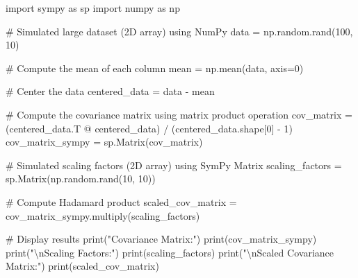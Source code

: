 \documentclass[
  letterpaper,
  DIV=11,
  numbers=noendperiod]{scrreprt}
\newenvironment{Shaded}{\begin{snugshade}}{\end{snugshade}}
\newcommand{\BuiltInTok}[1]{\textcolor[rgb]{0.00,0.23,0.31}{#1}}
\newcommand{\CharTok}[1]{\textcolor[rgb]{0.13,0.47,0.30}{#1}}
\newcommand{\CommentTok}[1]{\textcolor[rgb]{0.37,0.37,0.37}{#1}}
\newcommand{\DecValTok}[1]{\textcolor[rgb]{0.68,0.00,0.00}{#1}}
\newcommand{\ImportTok}[1]{\textcolor[rgb]{0.00,0.46,0.62}{#1}}
\newcommand{\NormalTok}[1]{\textcolor[rgb]{0.00,0.23,0.31}{#1}}
\newcommand{\OperatorTok}[1]{\textcolor[rgb]{0.37,0.37,0.37}{#1}}
\newcommand{\StringTok}[1]{\textcolor[rgb]{0.13,0.47,0.30}{#1}}
\theoremstyle{plain}
\theoremstyle{definition}
\theoremstyle{remark}
\begin{document}
\begin{Shaded}
\begin{Highlighting}[]
\ImportTok{import}\NormalTok{ sympy }\ImportTok{as}\NormalTok{ sp}
\ImportTok{import}\NormalTok{ numpy }\ImportTok{as}\NormalTok{ np}

\CommentTok{\# Simulated large dataset (2D array) using NumPy}
\NormalTok{data }\OperatorTok{=}\NormalTok{ np.random.rand(}\DecValTok{100}\NormalTok{, }\DecValTok{10}\NormalTok{)}

\CommentTok{\# Compute the mean of each column}
\NormalTok{mean }\OperatorTok{=}\NormalTok{ np.mean(data, axis}\OperatorTok{=}\DecValTok{0}\NormalTok{)}

\CommentTok{\# Center the data}
\NormalTok{centered\_data }\OperatorTok{=}\NormalTok{ data }\OperatorTok{{-}}\NormalTok{ mean}

\CommentTok{\# Compute the covariance matrix using matrix product operation}
\NormalTok{cov\_matrix }\OperatorTok{=}\NormalTok{ (centered\_data.T }\OperatorTok{@}\NormalTok{ centered\_data) }\OperatorTok{/}\NormalTok{ (centered\_data.shape[}\DecValTok{0}\NormalTok{] }\OperatorTok{{-}} \DecValTok{1}\NormalTok{)}
\NormalTok{cov\_matrix\_sympy }\OperatorTok{=}\NormalTok{ sp.Matrix(cov\_matrix)}

\CommentTok{\# Simulated scaling factors (2D array) using SymPy Matrix}
\NormalTok{scaling\_factors }\OperatorTok{=}\NormalTok{ sp.Matrix(np.random.rand(}\DecValTok{10}\NormalTok{, }\DecValTok{10}\NormalTok{))}

\CommentTok{\# Compute Hadamard product}
\NormalTok{scaled\_cov\_matrix }\OperatorTok{=}\NormalTok{ cov\_matrix\_sympy.multiply(scaling\_factors)}

\CommentTok{\# Display results}
\BuiltInTok{print}\NormalTok{(}\StringTok{"Covariance Matrix:"}\NormalTok{)}
\BuiltInTok{print}\NormalTok{(cov\_matrix\_sympy)}
\BuiltInTok{print}\NormalTok{(}\StringTok{"}\CharTok{\textbackslash{}n}\StringTok{Scaling Factors:"}\NormalTok{)}
\BuiltInTok{print}\NormalTok{(scaling\_factors)}
\BuiltInTok{print}\NormalTok{(}\StringTok{"}\CharTok{\textbackslash{}n}\StringTok{Scaled Covariance Matrix:"}\NormalTok{)}
\BuiltInTok{print}\NormalTok{(scaled\_cov\_matrix)}
\end{Highlighting}
\end{Shaded}
\end{document}

